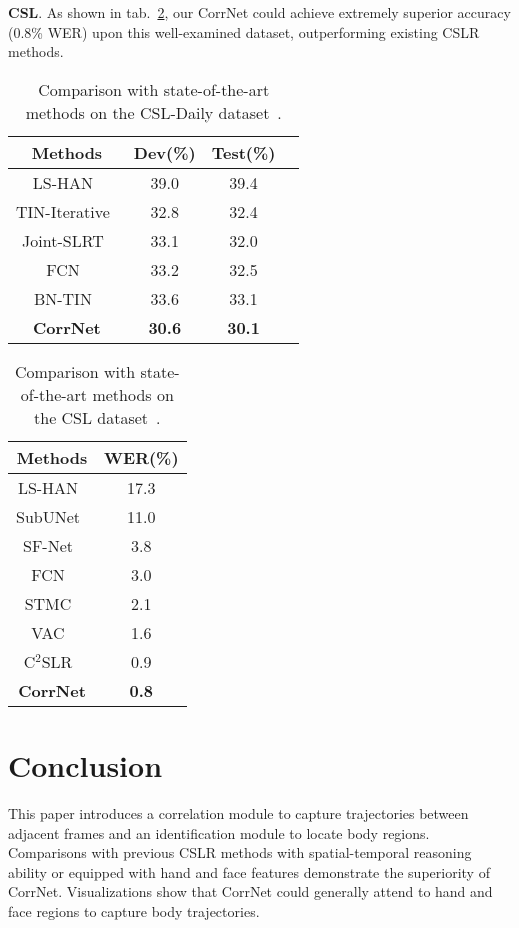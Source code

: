 \documentclass[10pt,twocolumn,letterpaper]{article}
\begin{document}
\textbf{CSL}. As shown in tab.~\ref{tab10}, our CorrNet could achieve extremely superior accuracy (0.8\% WER) upon this well-examined dataset, outperforming existing CSLR methods.

\begin{table}[t]   
  \centering
  \setlength\tabcolsep{2pt}
  \begin{tabular}{cccc}
  \hline
  Methods&  Dev(\%) & Test(\%)\\
  \hline
LS-HAN~\cite{huang2018video}  & 39.0  & 39.4\\
  TIN-Iterative~\cite{cui2019deep}  & 32.8  & 32.4\\
  Joint-SLRT~\cite{camgoz2020sign}  & 33.1  & 32.0 \\
  FCN~\cite{cheng2020fully} & 33.2  & 32.5 \\
  BN-TIN~\cite{zhou2021improving} & 33.6  & 33.1 \\
\hline
\textbf{CorrNet} & \textbf{30.6} & \textbf{30.1} \\
  \hline
  \end{tabular}  
  \caption{Comparison with state-of-the-art methods on the CSL-Daily dataset~\cite{zhou2021improving}.} 
  \label{tab9}
  \end{table}

\begin{table}[t]   
  \centering
  \setlength\tabcolsep{2pt}
  \begin{tabular}{cc}
    \hline
    Methods&  WER(\%)\\
    \hline
    LS-HAN~\cite{huang2018video}  & 17.3 \\
    SubUNet~\cite{cihan2017subunets}   & 11.0\\
    SF-Net~\cite{yang2019sf} & 3.8 \\
    FCN~\cite{cheng2020fully}   & 3.0 \\
    STMC~\cite{zhou2020spatial}  & 2.1 \\
    VAC~\cite{Min_2021_ICCV} & 1.6 \\
    C$^2$SLR~\cite{zuo2022c2slr} & 0.9 \\
    \hline
\textbf{CorrNet} & \textbf{0.8} \\
    \hline
    \end{tabular}  
    \caption{Comparison with state-of-the-art methods on the CSL dataset~\cite{huang2018video}.} 
    \label{tab10}
    \vspace{-5px}
  \end{table}

\section{Conclusion}
This paper introduces a correlation module to capture trajectories between adjacent frames and an identification module to locate body regions. Comparisons with previous CSLR methods with spatial-temporal reasoning ability or equipped with hand and face features demonstrate the superiority of CorrNet. Visualizations show that CorrNet could generally attend to hand and face regions to capture body trajectories.
{\small


}
\end{document}
